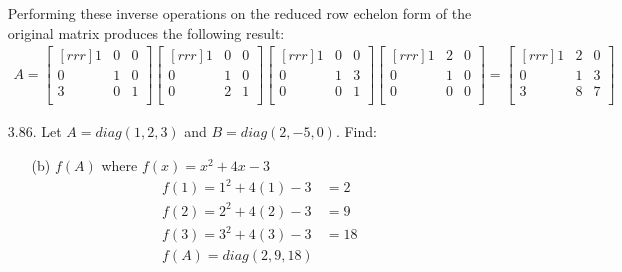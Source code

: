 \documentclass[12pt]{article}
\begin{document}
\begin{enumerate}
	Performing these inverse operations on the reduced row echelon form of the original matrix produces the following result:
	\begin{align*}
	A= 
	\begin{bmatrix}[rrr] 1 & 0 & 0\\ 0 & 1 & 0\\ 3 & 0 & 1\\ \end{bmatrix}
	\begin{bmatrix}[rrr] 1 & 0 & 0\\ 0 & 1 & 0\\ 0 & 2 & 1\\ \end{bmatrix}
	\begin{bmatrix}[rrr] 1 & 0 & 0\\ 0 & 1 & 3\\ 0 & 0 & 1\\ \end{bmatrix}
	\begin{bmatrix}[rrr] 1 & 2 & 0\\ 0 & 1 & 0\\ 0 & 0 & 0\\ \end{bmatrix}
	=
	\begin{bmatrix}[rrr] 1 & 2 & 0\\ 0 & 1 & 3\\ 3 & 8 & 7\\ \end{bmatrix}
	\end{align*}
	
\item [3.86.] Let $A=diag(1,2,3)$ and $B=diag(2,-5,0)$. Find:
	\begin{enumerate}
	\item [(b)] $f(A)$ where $f(x)=x^2+4x-3$\\
	\begin{align*}
	f(1) = 1^2+4(1)-3 &= 2\\
	f(2) = 2^2+4(2)-3 &= 9\\
	f(3) = 3^2+4(3)-3 &= 18\\
	f(A) = diag(2,9,18)	
	\end{align*}
	
	\end{enumerate}



\end{enumerate}
\end{document}
